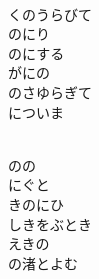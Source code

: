 \documentclass[10pt,b5j]{tarticle} %
\begin{document}
\begin{enumerate}
\begin{minipage}[c]{\blocksize}
        \vspace{\linespace}
        \item~\\
        くのうらびて\\
        のにり\\
        のにする\\
        がにの\\
        のさゆらぎて\\
        についま
        
        \vspace{\linespace}
        \item~\\
        のの\\
        にぐと\\
        きのにひ\\
        しきをぶとき\\
        えきの\\
        の渚とよむ
    
    \end{minipage}
\end{enumerate} %
\end{document}
